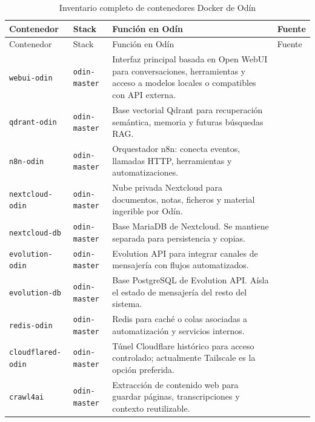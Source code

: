 \begingroup
\tiny
\setlength{\tabcolsep}{2pt}
\setlength{\LTpre}{0pt}
\setlength{\LTpost}{8pt}
\begin{longtable}{p{}p{}p{}p{}}
  \caption{Inventario completo de contenedores Docker de Odín}
  \label{tab:contenedores-docker-completos}\\
  \toprule
  Contenedor & Stack & Función en Odín & Fuente \\
  \midrule
  \endfirsthead
  \toprule
  Contenedor & Stack & Función en Odín & Fuente \\
  \midrule
  \endhead
  \bottomrule
  \endfoot
  \texttt{webui-odin} & \texttt{odin-master} & Interfaz principal basada en Open WebUI para conversaciones, herramientas y acceso a modelos locales o compatibles con API externa. & \citep{openwebuiDocs} \\
  \texttt{qdrant-odin} & \texttt{odin-master} & Base vectorial Qdrant para recuperación semántica, memoria y futuras búsquedas RAG. & \citep{qdrantDocs,qdrantStorageDocs} \\
  \texttt{n8n-odin} & \texttt{odin-master} & Orquestador n8n: conecta eventos, llamadas HTTP, herramientas y automatizaciones. & \citep{n8nDocs,n8nDockerDocs} \\
  \texttt{nextcloud-odin} & \texttt{odin-master} & Nube privada Nextcloud para documentos, notas, ficheros y material ingerible por Odín. & \citep{nextcloudDocs} \\
  \texttt{nextcloud-db} & \texttt{odin-master} & Base MariaDB de Nextcloud. Se mantiene separada para persistencia y copias. & \citep{mariadbDocs,nextcloudDocs} \\
  \texttt{evolution-odin} & \texttt{odin-master} & Evolution API para integrar canales de mensajería con flujos automatizados. & \citep{evolutionApiDocs} \\
  \texttt{evolution-db} & \texttt{odin-master} & Base PostgreSQL de Evolution API. Aísla el estado de mensajería del resto del sistema. & \citep{postgres15Docs,evolutionApiDocs} \\
  \texttt{redis-odin} & \texttt{odin-master} & Redis para caché o colas asociadas a automatización y servicios internos. & \citep{redisDocs} \\
  \texttt{cloudflared-odin} & \texttt{odin-master} & Túnel Cloudflare histórico para acceso controlado; actualmente Tailscale es la opción preferida. & \citep{cloudflareTunnelDocs,tailscaleWhatIs} \\
  \texttt{crawl4ai} & \texttt{odin-master} & Extracción de contenido web para guardar páginas, transcripciones y contexto reutilizable. & \citep{crawl4aiDocs} \\

\end{longtable}
